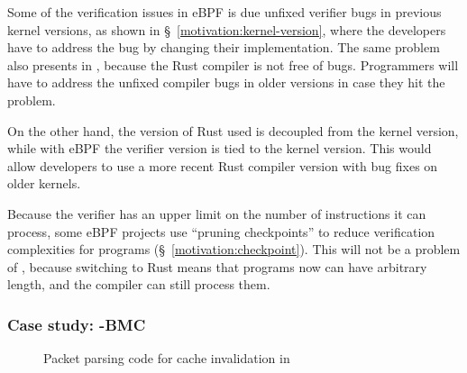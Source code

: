 
Some of the verification issues in eBPF is due unfixed verifier bugs in
    previous kernel versions, as shown in \S~\ref{motivation:kernel-version},
    where the developers have to address the bug by changing their
    implementation.
The same problem also presents in \projname{}, because the Rust compiler is not
    free of bugs.
Programmers will have to address the unfixed compiler bugs in older versions
    in case they hit the problem.

On the other hand, the version of Rust used is decoupled from the kernel version, while
    with eBPF the verifier version is tied to the kernel version.
This would allow developers to use a more recent Rust compiler version with 
    bug fixes on older kernels.

Because the verifier has an upper limit on the number of instructions it can
    process, some eBPF projects use ``pruning checkpoints'' to reduce
    verification complexities for programs (\S~\ref{motivation:checkpoint}).
This will not be a problem of \projname{}, because switching to Rust means that
    programs now can have arbitrary length, and the compiler can still process
    them.

\subsubsection{Case study: \projname{}-BMC}
\label{eval:bmc-case-study}

\begin{figure}[t]
    
    \vspace{-10pt}
    \caption{Packet parsing code for cache invalidation in \projname{}}
    \vspace{-10pt}
    \label{fig:rust-code}
\end{figure}


